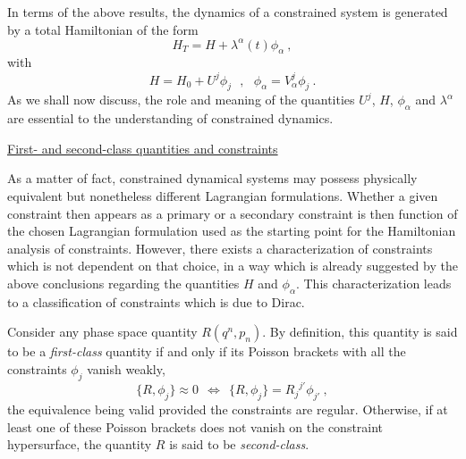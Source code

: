 \documentclass[a4paper,11pt]{article}
\begin{document}
In terms of the above results, the dynamics of a constrained system is
generated by a total Hamiltonian of the form
\begin{equation}
H_T=H+\lambda^\alpha(t)\phi_\alpha\ ,
\end{equation}
with
\begin{equation}
H=H_0+U^j\phi_j\ \ \ ,\ \ \ 
\phi_\alpha=V^j_\alpha\phi_j\ .
\end{equation}
As we shall now discuss, the role and meaning of the quantities $U^j$,
$H$, $\phi_\alpha$ and $\lambda^\alpha$ are essential to the understanding
of constrained dynamics.

\vspace{10pt}

\noindent\underline{First- and second-class quantities and constraints}

\vspace{5pt}

As a matter of fact, constrained dynamical systems may possess physically
equivalent but nonetheless different Lagrangian formulations. Whether a
given constraint then appears as a primary or a secondary constraint is
then function of the chosen Lagrangian formulation used as the starting
point for the Hamiltonian analysis of constraints. However, there exists
a characterization of constraints which is not dependent on that choice,
in a way which is already suggested by the above conclusions regarding the
quantities $H$ and $\phi_\alpha$. This characterization leads to a 
classification of constraints which is due to Dirac.\cite{Dirac}

Consider any phase space quantity $R(q^n,p_n)$. By definition,
this quantity is said to be a {\sl first-class\/} quantity if and only if
its Poisson brackets with all the constraints $\phi_j$ vanish weakly,
\begin{equation}
\{R,\phi_j\}\approx 0\ \ \Longleftrightarrow\ \ 
\{R,\phi_j\}={R_j}^{j'}\phi_{j'}\ ,
\end{equation}
the equivalence being valid provided the constraints are regular.
Otherwise, if at least one of these Poisson brackets does not vanish
on the constraint hypersurface, the quantity $R$ is said to be
{\sl second-class\/}.
\end{document}
